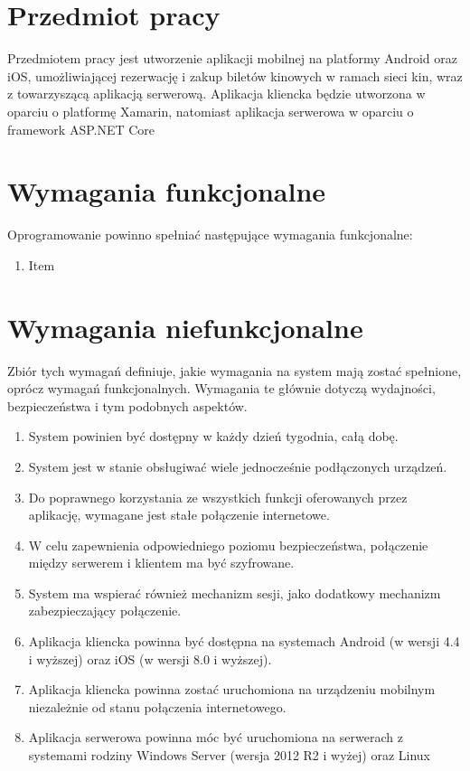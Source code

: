 \section{Przedmiot pracy}
Przedmiotem pracy jest utworzenie aplikacji mobilnej na platformy Android oraz iOS, umożliwiającej rezerwację i zakup biletów kinowych w ramach sieci kin, wraz z towarzyszącą aplikacją serwerową. Aplikacja kliencka będzie utworzona w oparciu o platformę Xamarin, natomiast aplikacja serwerowa w oparciu o framework ASP.NET Core
\section{Wymagania funkcjonalne}
Oprogramowanie powinno spełniać następujące wymagania funkcjonalne:
\begin{enumerate}
\item Item
\end{enumerate}
\section{Wymagania niefunkcjonalne}
Zbiór tych wymagań definiuje, jakie wymagania na system mają zostać spełnione, oprócz wymagań funkcjonalnych. Wymagania te głównie dotyczą wydajności, bezpieczeństwa i tym podobnych aspektów.
\begin{enumerate}
\item System powinien być dostępny w każdy dzień tygodnia, całą dobę.
\item System jest w stanie obsługiwać wiele jednocześnie podłączonych urządzeń.
\item Do poprawnego korzystania ze wszystkich funkcji oferowanych przez aplikację, wymagane jest stałe połączenie internetowe.
\item W celu zapewnienia odpowiedniego poziomu bezpieczeństwa, połączenie między serwerem i klientem ma być szyfrowane.
\item System ma wspierać również mechanizm sesji, jako dodatkowy mechanizm zabezpieczający połączenie.
\item Aplikacja kliencka powinna być dostępna na systemach Android (w wersji 4.4 i wyższej) oraz iOS (w wersji 8.0 i wyższej).
\item Aplikacja kliencka powinna zostać uruchomiona na urządzeniu mobilnym niezależnie od stanu połączenia internetowego.
\item Aplikacja serwerowa powinna móc być uruchomiona na serwerach z systemami rodziny Windows Server (wersja 2012 R2 i wyżej) oraz Linux

\end{enumerate}
